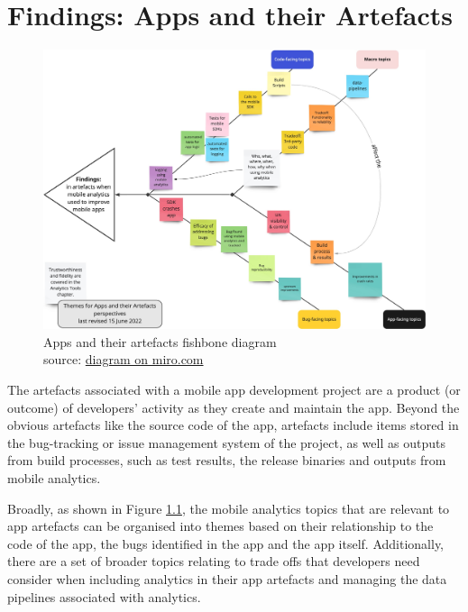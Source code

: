 \setchapterpreamble[u]{\margintoc}
\chapter{Findings: Apps and their Artefacts}

\begin{figure}
    \centering
    \includegraphics[width=0.8\linewidth]{images/rough-sketches/apps-and-their-artefacts-fishbone-15-jun-2022-d.jpeg}
    \caption{Apps and their artefacts fishbone diagram\\source: \href{https://miro.com/app/board/uXjVOts6mvo=/?share_link_id=402034254193}{diagram on miro.com}}
    \label{fig:apps-and-their-artefacts-fishbone}
\end{figure}


The artefacts associated with a mobile app development project are a product (or outcome) of developers' activity as they create and maintain the app. Beyond the obvious artefacts like the source code of the app, artefacts include items stored in the bug-tracking or issue management system of the project, as well as outputs from build processes, such as test results, the release binaries and outputs from mobile analytics.

Broadly, as shown in Figure \ref{fig:apps-and-their-artefacts-fishbone}, the mobile analytics topics that are relevant to app artefacts can be organised into themes based on their relationship to the code of the app, the bugs identified in the app and the app itself. Additionally, there are a set of broader topics relating to trade offs that developers need consider when including analytics in their app artefacts and managing the data pipelines associated with analytics.

